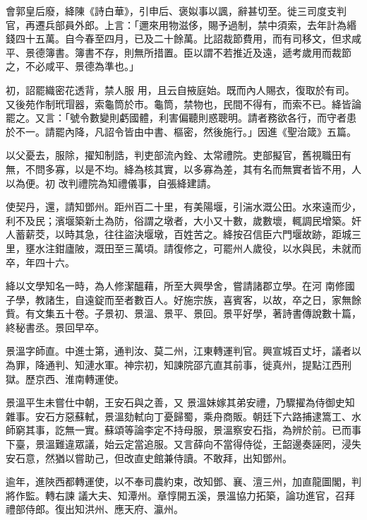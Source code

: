 \begin{pinyinscope}
 會郭皇后廢，絳陳《詩白華》，引申后、褒姒事以諷，辭甚切至。徙三司度支判官，再遷兵部員外郎。上言：「邇來用物滋侈，賜予過制，禁中須索，去年計為緡錢四十五萬。自今春至四月，已及二十餘萬。比詔裁節費用，而有司移文，但求咸平、景德簿書。簿書不存，則無所措置。臣以謂不若推近及遠，遞考歲用而裁節之，不必咸平、景德為準也。」



 初，詔罷織密花透背，禁人服
 用，且云自掖庭始。既而內人賜衣，復取於有司。又後苑作制玳瑁器，索龜筒於市。龜筒，禁物也，民間不得有，而索不已。絳皆論罷之。又言：「號令數變則虧國體，利害偏聽則惑聰明。請者務欲各行，而守者患於不一。請罷內降，凡詔令皆由中書、樞密，然後施行。」因進《聖治箴》五篇。



 以父憂去，服除，擢知制誥，判吏部流內銓、太常禮院。吏部擬官，舊視職田有無，不問多寡，以是不均。絳為核其實，以多寡為差，其有名而無實者皆不用，人以為便。初
 改判禮院為知禮儀事，自張絳建請。



 使契丹，還，請知鄧州。距州百二十里，有美陽堰，引湍水溉公田。水來遠而少，利不及民；濱堰築新土為防，俗謂之墩者，大小又十數，歲數壞，輒調民增築。奸人蓄薪茭，以時其急，往往盜決堰墩，百姓苦之。絳按召信臣六門堰故跡，距城三里，壅水注鉗廬陂，溉田至三萬頃。請復修之，可罷州人歲役，以水與民，未就而卒，年四十六。



 絳以文學知名一時，為人修潔醞藉，所至大興學舍，嘗請諸郡立學。在河
 南修國子學，教諸生，自遠錠而至者數百人。好施宗族，喜賓客，以故，卒之日，家無餘貲。有文集五十卷。子景初、景溫、景平、景回。景平好學，著詩書傳說數十篇，終秘書丞。景回早卒。



 景溫字師直。中進士第，通判汝、莫二州，江東轉運判官。興宣城百丈圩，議者以為罪，降通判、知漣水軍。神宗初，知諫院邵亢直其前事，徙真州，提點江西刑獄。歷京西、淮南轉運使。



 景溫平生未嘗仕中朝，王安石與之善，又
 景溫妹嫁其弟安禮，乃驟擢為侍御史知雜事。安石方惡蘇軾，景溫劾軾向丁憂歸蜀，乘舟商販。朝廷下六路捕逮篙工、水師窮其事，訖無一實。蘇頌等論李定不持母服，景溫察安石指，為辨於前。已而事下臺，景溫難違眾議，始云定當追服。又言薛向不當得侍從，王韶邊奏誣罔，浸失安石意，然猶以嘗助己，但改直史館兼侍讀。不敢拜，出知鄧州。



 逾年，進陜西都轉運使，以不奉司農約束，改知鄧、襄、澶三州，加直龍圖閣，判將作監。轉右諫
 議大夫、知潭州。章惇開五溪，景溫協力拓築，論功進官，召拜禮部侍郎。復出知洪州、應天府、瀛州。




\end{pinyinscope}
